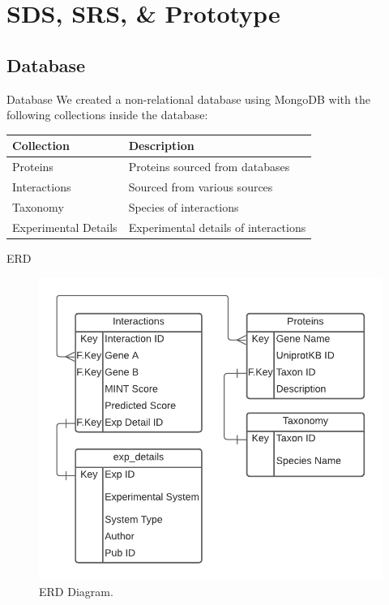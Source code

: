 \documentclass[aspectratio=169]{beamer}
\begin{document}
\section{SDS, SRS, \& Prototype}
\subsection{Database}
\begin{frame}{Database}
    We created a non-relational database using MongoDB with the following collections inside the database:
    \begin{table}[htpb]
      \centering
      \vspace{1 em}
      \label{tab:database}
      \begin{tabular}{l|l}
      \hline
      Collection & Description \\
      \hline
      Proteins & Proteins sourced from databases\\ 
      Interactions & Sourced from various sources\\
      Taxonomy & Species of interactions\\ 
      Experimental Details & Experimental details of interactions \\
    \hline
    \end{tabular}
  \end{table}
\end{frame}

\begin{frame}{ERD}
    \begin{figure}[h!]
    \centering
    \includegraphics[scale=0.6]{Documentation/Presentation/ERD.png}
    \caption{ERD Diagram.}
    \label{fig: ERD}
    \end{figure}
\end{frame}
\end{document}
